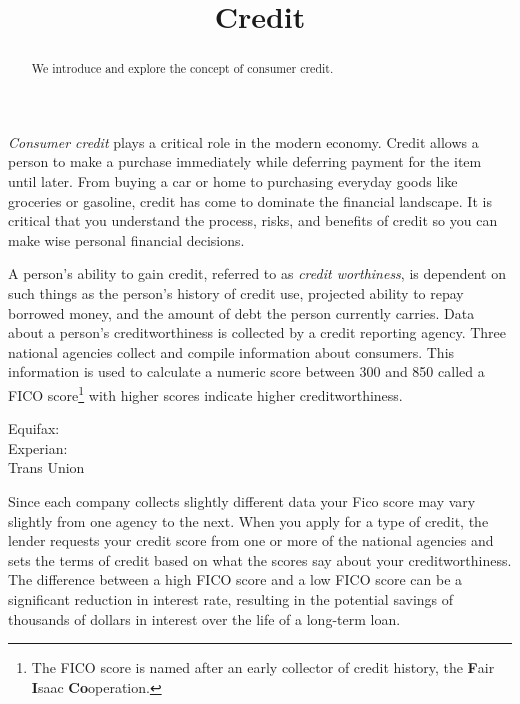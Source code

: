 \documentclass{ximera}
\title{Credit}
\begin{document}
\begin{abstract}
We introduce and explore the concept of consumer credit.
\end{abstract}

\maketitle

\emph{Consumer credit} plays a critical role in the modern economy. Credit allows a person to make a purchase immediately while deferring payment for the item until later. From buying a car or home to purchasing everyday goods like groceries or gasoline, credit has come to dominate the financial landscape. It is critical that you understand the process, risks, and benefits of credit so you can make wise personal financial decisions.

A person's ability to gain credit, referred to as \emph{credit worthiness}, is dependent on such things as the person's history of credit use, projected ability to repay borrowed money, and the amount of debt the person currently carries. Data about a person's creditworthiness is collected by a credit reporting agency. Three national agencies collect and compile information about consumers. This information is used to calculate a numeric score between 300 and 850 called a FICO score\footnote{The FICO score is named after an early collector of credit history, the \textbf{F}air \textbf{I}saac \textbf{Co}operation.} with higher scores indicate higher creditworthiness.
\begin{description}
\item[Equifax:] 
\item[Experian:] 
\item[Trans Union] 
\end{description}

Since each company collects slightly different data your Fico score may vary slightly from one agency to the next.  When you apply for a type of credit, the lender requests your credit score from one or more of the national agencies and sets the terms of credit based on what the scores say about your creditworthiness. The difference between a high FICO score and a low FICO score can be a significant reduction in interest rate, resulting in the potential savings of thousands of dollars in interest over the life of a long-term loan.
\end{document}
